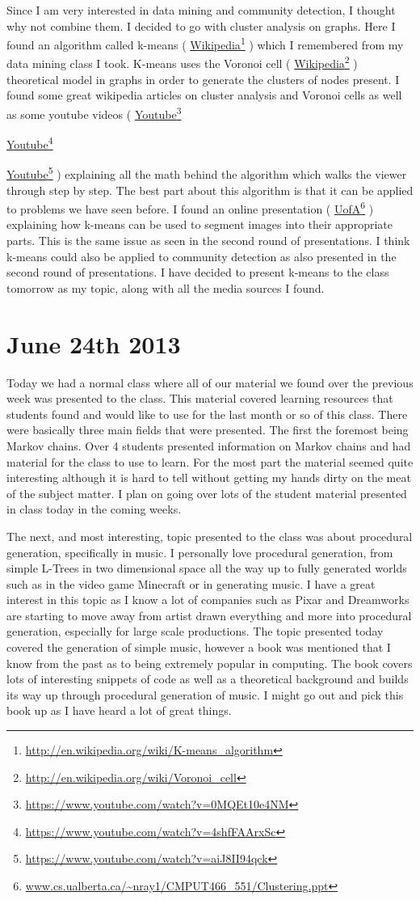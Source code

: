 \documentclass[conference]{IEEEtran}
\newcommand\fnurl[2]{%
  \href{#2}{#1}\footnote{\url{#2}}%
}
\begin{document}
Since I am very interested in data mining and community detection, I thought why not combine them.
I decided to go with cluster analysis on graphs. Here I found an algorithm called 
k-means (\fnurl{Wikipedia}{http://en.wikipedia.org/wiki/K-means_algorithm}) which I
remembered from my data mining class I took. K-means uses the 
Voronoi cell (\fnurl{Wikipedia}{http://en.wikipedia.org/wiki/Voronoi_cell}) theoretical model in graphs
in order to generate the clusters of nodes present. I found some great wikipedia articles on cluster
analysis and Voronoi cells as well as some 
youtube videos (\fnurl{Youtube}{https://www.youtube.com/watch?v=0MQEt10e4NM}
\fnurl{Youtube}{https://www.youtube.com/watch?v=4shfFAArxSc}
\fnurl{Youtube}{https://www.youtube.com/watch?v=aiJ8II94qck}) 
explaining all the math behind the algorithm
which walks the viewer through step by step. The best part about this algorithm is that it can be applied
to problems we have seen before. I found an online 
presentation (\fnurl{UofA}{www.cs.ualberta.ca/~nray1/CMPUT466_551/Clustering.ppt‎}) explaining how k-means can be used to
segment images into their appropriate parts. This is the same issue as seen in the second round of 
presentations. I think k-means could also be applied to community detection as also presented in the
second round of presentations. I have decided to present k-means to the class tomorrow as my topic,
along with all the media sources I found.

\section{June 24th 2013}
Today we had a normal class where all of our material we found over the previous week was presented to
the class. This material covered learning resources that students found and would like to use for the last
month or so of this class. There were basically three main fields that were presented. The first the foremost
being Markov chains. Over 4 students presented information on Markov chains and had material for the class
to use to learn. For the most part the material seemed quite interesting although it is hard to tell without
getting my hands dirty on the meat of the subject matter. I plan on going over lots of the student material
presented in class today in the coming weeks.

The next, and most interesting, topic presented to the class was about procedural generation, specifically
in music. I personally love procedural generation, from simple L-Trees in two dimensional space all the way up
to fully generated worlds such as in the video game Minecraft or in generating music. I have a great interest
in this topic as I know a lot of companies such as Pixar and Dreamworks are starting to move away from artist
drawn everything and more into procedural generation, especially for large scale productions. The topic presented
today covered the generation of simple music, however a book was mentioned that I know from the past as to being
extremely popular in computing. The book covers lots of interesting snippets of code as well as a theoretical
background and builds its way up through procedural generation of music. I might go out and pick this book up
as I have heard a lot of great things.
\end{document}
